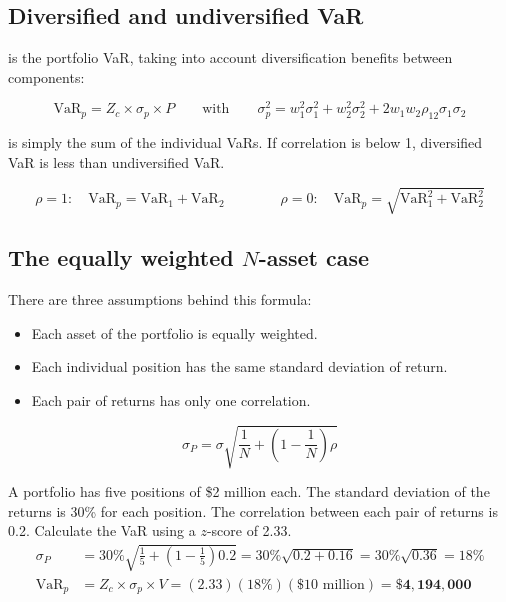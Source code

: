 \subsection{Diversified and undiversified VaR}

 is the portfolio VaR, taking into account diversification
benefits between components:
\begin{imfmlbox}
\[ \text{VaR}_p = Z_c \times \sigma_p \times P
   \qquad\text{with}\qquad
   \sigma_p^2 = w_1^2\sigma_1^2 + w_2^2\sigma_2^2 + 2w_1w_2\rho_{12}\sigma_1\sigma_2 \]
\end{imfmlbox}

 is simply the sum of the individual VaRs. If correlation
is below 1, diversified VaR is less than undiversified VaR.

\begin{imfmlbox}
\[ \rho = 1:\quad \text{VaR}_p = \text{VaR}_1 + \text{VaR}_2
   \qquad\qquad
   \rho = 0:\quad \text{VaR}_p = \sqrt{\text{VaR}_1^2 + \text{VaR}_2^2} \]
\end{imfmlbox}

\subsection{The equally weighted $N$-asset case}

There are three assumptions behind this formula:

\begin{itemize}
\item Each asset of the portfolio is equally weighted.
\item Each individual position has the same standard deviation of return.
\item Each pair of returns has only one correlation.
\end{itemize}

\begin{imfmlbox}
\[ \sigma_P = \sigma\sqrt{\frac{1}{N} + \left(1 - \frac{1}{N}\right)\rho} \]
\end{imfmlbox}

\begin{imexbox}[title={Five positions, one correlation}]
A portfolio has five positions of \$2 million each. The standard deviation of the
returns is 30\% for each position. The correlation between each pair of returns
is 0.2. Calculate the VaR using a $z$-score of 2.33.
\begin{align*}
\sigma_P &= 30\%\sqrt{\tfrac{1}{5} + \left(1 - \tfrac{1}{5}\right)0.2}
  = 30\%\sqrt{0.2 + 0.16} = 30\%\sqrt{0.36} = 18\% \\[2pt]
\text{VaR}_p &= Z_c \times \sigma_p \times V = (2.33)(18\%)(\$10\text{ million})
  = \mathbf{\$4{,}194{,}000}
\end{align*}
\end{imexbox}

